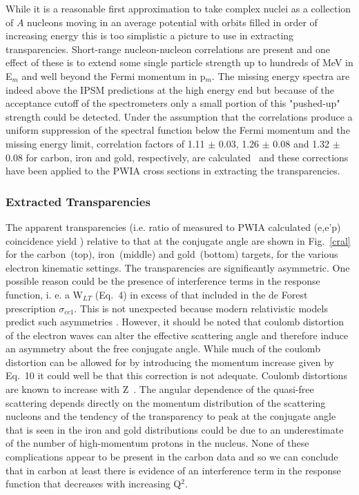 \documentclass[aps,prl,twocolumn,showpacs,amsmath,amssymb,floats]{revtex4}
\begin{document}
While it is a reasonable first approximation to take complex nuclei as a 
collection of $A$ nucleons moving in an average potential with orbits filled in 
order of increasing energy this is too simplistic a picture to use in extracting 
transparencies.  Short-range nucleon-nucleon correlations are present and one 
effect of these is to extend some single particle strength up to hundreds of MeV 
in E$_{m}$ and well beyond the Fermi momentum in p$_{m}$.  The missing 
energy spectra are indeed above the IPSM predictions at the high energy end but 
because of the acceptance cutoff of the spectrometers only a small portion of 
this "pushed-up" strength could be detected.  Under the assumption that the 
correlations produce a uniform suppression of the spectral function below the 
Fermi momentum and the missing energy limit, correlation factors of 
1.11 $\pm$ 0.03, 1.26 
$\pm$ 0.08 and 1.32 $\pm$ 0.08 for carbon, iron and gold, respectively, are 
calculated~\cite{vppw92} and these corrections have been applied to the PWIA 
cross sections in extracting the transparencies.  

\subsubsection*{Extracted Transparencies}

The apparent transparencies (i.e. ratio of measured to PWIA calculated (e,e'p) 
coincidence yield )  relative to that at the conjugate angle are shown in 
Fig.~\ref{cral} for the carbon~(top), iron~(middle) and gold~(bottom) targets, 
for the various electron kinematic settings. The transparencies are 
significantly asymmetric.  One possible reason could be the presence of 
interference terms in the response function, i. e. a W$_{LT}$ (Eq.~4) in excess 
of that included in the de Forest prescription $\sigma_{cc1}$.  This is not 
unexpected because modern relativistic models predict such asymmetries \cite 
{Kelley2, Udias2}. However, it should be noted that coulomb distortion of the 
electron waves can alter the effective scattering angle and therefore induce an 
asymmetry about the free conjugate angle.  While much of the coulomb distortion 
can be allowed for by introducing the momentum increase given by Eq.~10 it could 
well be that this correction is not adequate.  Coulomb distortions are known 
to increase with Z~\cite{couldistth}.  The 
angular dependence of the quasi-free scattering depends directly on the momentum distribution of the scattering nucleons and the tendency of the 
transparency to peak at the conjugate angle that is seen in the iron and gold 
distributions could be due to an underestimate of the number of high-momentum 
protons in the nucleus.  None of these complications appear to be present in the 
carbon data and so we can conclude that in carbon at least there is evidence of 
an interference term in the response function that decreases with increasing 
Q$^2$.  
\end{document}
